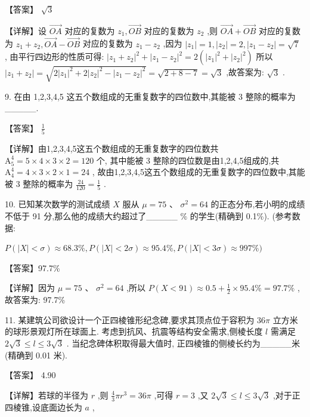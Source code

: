 \documentclass[10pt]{article}
\begin{document}
【答案】 \(\sqrt{3}\)

【详解】设 \(\overrightarrow{OA}\) 对应的复数为 \({z}_{1},\overrightarrow{OB}\) 对应的复数为 \({z}_{2}\) ,则 \(\overrightarrow{OA} + \overrightarrow{OB}\) 对应的复数为 \({z}_{1} + {z}_{2},\overrightarrow{OA} - \overrightarrow{OB}\) 对应的复数为 \({z}_{1} - {z}_{2}\) ,因为 \(\left| {z}_{1}\right|  = 1,\left| {z}_{2}\right|  = 2,\left| {{z}_{1} - {z}_{2}}\right|  = \sqrt{7}\) , 由平行四边形的性质可得: \({\left| {z}_{1} + {z}_{2}\right| }^{2} + {\left| {z}_{1} - {z}_{2}\right| }^{2} = 2\left( {{\left| {z}_{1}\right| }^{2} + {\left| {z}_{2}\right| }^{2}}\right)\) 所以 \(\left| {{z}_{1} + {z}_{2}}\right|  = \sqrt{2{\left| {z}_{1}\right| }^{2} + 2{\left| {z}_{2}\right| }^{2} - {\left| {z}_{1} - {z}_{2}\right| }^{2}} = \sqrt{2 + 8 - 7} = \sqrt{3}\) ,故答案为: \(\sqrt{3}\) .

9. 在由 1,2,3,4,5 这五个数组成的无重复数字的四位数中,其能被 3 整除的概率为\_\_\_\_\_.

【答案】 \(\frac{1}{5}\)

【详解】由1,2,3,4,5这五个数组成的无重复数字的四位数共 \({\mathrm{A}}_{5}^{4} = 5 \times  4 \times  3 \times  2 = {120}\) 个, 其中能被 3 整除的四位数是由1,2,4,5组成的,共 \({\mathrm{A}}_{4}^{4} = 4 \times  3 \times  2 \times  1 = {24}\) , 故由1,2,3,4,5这五个数组成的无重复数字的四位数中,其能被 3 整除的概率为 \(\frac{24}{120} = \frac{1}{5}\) .

10. 已知某次数学的测试成绩 \(X\) 服从 \(\mu  = {75}\text{ 、 }{\sigma }^{2} = {64}\) 的正态分布,若小明的成绩不低于 91 分,那么他的成绩大约超过了\_\_\_\_\_ \(\%\) 的学生(精确到 0.1\%). (参考数据:

\(P\left( {\left| X\right|  < \sigma }\right)  \approx  {68.3}\% ,P\left( {\left| X\right|  < {2\sigma }}\right)  \approx  {95.4}\% ,P\left( {\left| X\right|  < {3\sigma }}\right)  \approx  {997}\% )\)

【答案】97.7\%

【详解】因为 \(\mu  = {75}\text{ 、 }{\sigma }^{2} = {64}\) ,所以 \(P\left( {X < {91}}\right)  \approx  {0.5} + \frac{1}{2} \times  {95.4}\%  = {97.7}\%\) ,故答案为: 97.7\%

11. 某建筑公司欲设计一个正四棱锥形纪念碑,要求其顶点位于容积为 \({36\pi }\) 立方米的球形景观灯所在球面上. 考虑到抗风、抗震等结构安全需求,侧棱长度 \(l\) 需满足 \(2\sqrt{3} \leq  l \leq  3\sqrt{3}\) . 当纪念碑体积取得最大值时, 正四棱锥的侧棱长约为\_\_\_\_\_米(精确到 0.01 米).

【答案】 4.90

【详解】若球的半径为 \(r\) ,则 \(\frac{4}{3}\pi {r}^{3} = {36\pi }\) ,可得 \(r = 3\) ,又 \(2\sqrt{3} \leq  l \leq  3\sqrt{3}\) ,对于正四棱锥,设底面边长为 \(a\) ,
\end{document}
